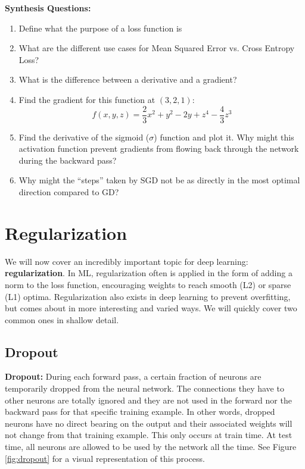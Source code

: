 \begin{questionbox}
    \textbf{Synthesis Questions:}
    \begin{enumerate}
        \item Define what the purpose of a loss function is
        \item What are the different use cases for Mean Squared Error vs. Cross Entropy Loss?
        \item What is the difference between a derivative and a gradient?
        \item Find the gradient for this function at $(3, 2, 1)$:
        $$f(x,y,z) = \frac{2}{3}x^2 + y^2 - 2y + z^4 - \frac{4}{3}z^3$$
        \item Find the derivative of the sigmoid ($\sigma$) function and plot it. Why might this activation function prevent gradients from flowing back through the network during the backward pass?
        \item Why might the ``steps'' taken by SGD not be as directly in the most optimal direction compared to GD?
    \end{enumerate}
\end{questionbox}

\section{Regularization}
    \large We will now cover an incredibly important topic for deep learning: \textbf{regularization}. In ML, regularization often is applied in the form of adding a norm to the loss function, encouraging weights to reach smooth (L2) or sparse (L1) optima. Regularization also exists in deep learning to prevent overfitting, but comes about in more interesting and varied ways. We will quickly cover two common ones in shallow detail.

\subsection{Dropout}
    \large \textbf{Dropout:} During each forward pass, a certain fraction of neurons are temporarily dropped from the neural network. The connections they have to other neurons are totally ignored and they are not used in the forward nor the backward pass for that specific training example. In other words, dropped neurons have no direct bearing on the output and their associated weights will not change from that training example. This only occurs at train time. At test time, all neurons are allowed to be used by the network all the time. See Figure \ref{fig:dropout} for a visual representation of this process.

